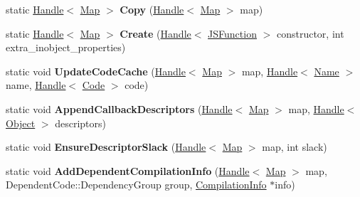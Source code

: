 \begin{DoxyCompactItemize}
\item 
\hypertarget{classv8_1_1internal_1_1_map_aec93d05a88e3fe4233ece471ff037653}{}static \hyperlink{classv8_1_1internal_1_1_handle}{Handle}$<$ \hyperlink{classv8_1_1internal_1_1_map}{Map} $>$ {\bfseries Copy} (\hyperlink{classv8_1_1internal_1_1_handle}{Handle}$<$ \hyperlink{classv8_1_1internal_1_1_map}{Map} $>$ map)\label{classv8_1_1internal_1_1_map_aec93d05a88e3fe4233ece471ff037653}

\item 
\hypertarget{classv8_1_1internal_1_1_map_a31b830fc51d0401678f5c54eeaa6fba3}{}static \hyperlink{classv8_1_1internal_1_1_handle}{Handle}$<$ \hyperlink{classv8_1_1internal_1_1_map}{Map} $>$ {\bfseries Create} (\hyperlink{classv8_1_1internal_1_1_handle}{Handle}$<$ \hyperlink{classv8_1_1internal_1_1_j_s_function}{J\+S\+Function} $>$ constructor, int extra\+\_\+inobject\+\_\+properties)\label{classv8_1_1internal_1_1_map_a31b830fc51d0401678f5c54eeaa6fba3}

\item 
\hypertarget{classv8_1_1internal_1_1_map_a09a00a5fb21095e602a359e0a8b9411a}{}static void {\bfseries Update\+Code\+Cache} (\hyperlink{classv8_1_1internal_1_1_handle}{Handle}$<$ \hyperlink{classv8_1_1internal_1_1_map}{Map} $>$ map, \hyperlink{classv8_1_1internal_1_1_handle}{Handle}$<$ \hyperlink{classv8_1_1internal_1_1_name}{Name} $>$ name, \hyperlink{classv8_1_1internal_1_1_handle}{Handle}$<$ \hyperlink{classv8_1_1internal_1_1_code}{Code} $>$ code)\label{classv8_1_1internal_1_1_map_a09a00a5fb21095e602a359e0a8b9411a}

\item 
\hypertarget{classv8_1_1internal_1_1_map_ac5911c6113c1f350821c63f8a660d223}{}static void {\bfseries Append\+Callback\+Descriptors} (\hyperlink{classv8_1_1internal_1_1_handle}{Handle}$<$ \hyperlink{classv8_1_1internal_1_1_map}{Map} $>$ map, \hyperlink{classv8_1_1internal_1_1_handle}{Handle}$<$ \hyperlink{classv8_1_1internal_1_1_object}{Object} $>$ descriptors)\label{classv8_1_1internal_1_1_map_ac5911c6113c1f350821c63f8a660d223}

\item 
\hypertarget{classv8_1_1internal_1_1_map_a56bc4d3d98d1fe0c04ef2cadb1774567}{}static void {\bfseries Ensure\+Descriptor\+Slack} (\hyperlink{classv8_1_1internal_1_1_handle}{Handle}$<$ \hyperlink{classv8_1_1internal_1_1_map}{Map} $>$ map, int slack)\label{classv8_1_1internal_1_1_map_a56bc4d3d98d1fe0c04ef2cadb1774567}

\item 
\hypertarget{classv8_1_1internal_1_1_map_a45572af86cfb31f07f7d74157f16d270}{}static void {\bfseries Add\+Dependent\+Compilation\+Info} (\hyperlink{classv8_1_1internal_1_1_handle}{Handle}$<$ \hyperlink{classv8_1_1internal_1_1_map}{Map} $>$ map, Dependent\+Code\+::\+Dependency\+Group group, \hyperlink{classv8_1_1internal_1_1_compilation_info}{Compilation\+Info} $\ast$info)\label{classv8_1_1internal_1_1_map_a45572af86cfb31f07f7d74157f16d270}


\end{DoxyCompactItemize}
